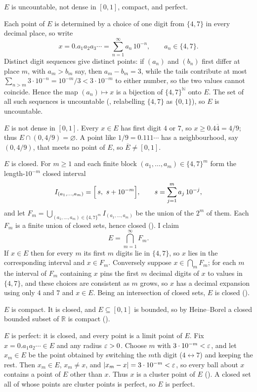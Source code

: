 \documentclass[main.tex]{subfiles}
\begin{document}
\begin{SolutionBlue}
$E$ is uncountable, not dense in $[0,1]$, compact, and perfect.

Each point of $E$ is determined by a choice of one digit from $\{4,7\}$ in every decimal place, so write
\[
x=0.a_1a_2a_3\cdots=\sum_{n=1}^{\infty}a_n\,10^{-n},\qquad a_n\in\{4,7\}.
\]
Distinct digit sequences give distinct points: if $(a_n)$ and $(b_n)$ first differ at place $m$, with
$a_m>b_m$ say, then $a_m-b_m=3$, while the tails contribute at most
$\sum_{n>m}3\cdot 10^{-n}=10^{-m}/3<3\cdot 10^{-m}$ to either number, so the two values cannot
coincide. Hence the map $(a_n)\mapsto x$ is a bijection of $\{4,7\}^{\mathbb N}$ onto $E$. The set of
all such sequences is uncountable (, relabelling $\{4,7\}$
as $\{0,1\}$), so $E$ is uncountable.

$E$ is not dense in $[0,1]$. Every $x\in E$ has first digit $4$ or $7$, so
$x\ge 0.4\overline{4}=4/9$; thus $E\cap(0,4/9)=\varnothing$. A point like $1/9=0.111\cdots$ has a
neighbourhood, say $(0,4/9)$, that meets no point of $E$, so $\overline E\ne[0,1]$.

$E$ is closed. For $m\ge 1$ and each finite block $(a_1,\dots,a_m)\in\{4,7\}^m$ form the length-$10^{-m}$
closed interval
\[
I_{(a_1,\dots,a_m)}=\Bigl[\,s,\ s+10^{-m}\Bigr],\qquad s=\sum_{j=1}^{m}a_j\,10^{-j},
\]
and let $F_m=\bigcup_{(a_1,\dots,a_m)\in\{4,7\}^m}I_{(a_1,\dots,a_m)}$ be the union of the
$2^m$ of them. Each $F_m$ is a finite union of closed sets, hence closed
(). I claim
\[
E=\bigcap_{m=1}^{\infty}F_m.
\]
If $x\in E$ then for every $m$ its first $m$ digits lie in $\{4,7\}$, so $x$ lies in the corresponding
interval and $x\in F_m$. Conversely suppose $x\in\bigcap_m F_m$; for each $m$ the interval of $F_m$
containing $x$ pins the first $m$ decimal digits of $x$ to values in $\{4,7\}$, and these choices are
consistent as $m$ grows, so $x$ has a decimal expansion using only $4$ and $7$ and $x\in E$. Being an
intersection of closed sets, $E$ is closed ().

$E$ is compact. It is closed, and $E\subseteq[0,1]$ is bounded, so by Heine--Borel a closed bounded
subset of $\mathbb R$ is compact ().

$E$ is perfect: it is closed, and every point is a limit point of $E$. Fix
$x=0.a_1a_2\cdots\in E$ and any radius $\varepsilon>0$. Choose $m$ with $3\cdot 10^{-m}<\varepsilon$, and let $x_m\in
E$ be the point obtained by switching the $m$th digit ($4\leftrightarrow7$) and keeping the rest. Then
$x_m\in E$, $x_m\ne x$, and $|x_m-x|=3\cdot 10^{-m}<\varepsilon$, so every ball about $x$ contains a point of
$E$ other than $x$. Thus $x$ is a cluster point of $E$ (). A closed set all of whose points
are cluster points is perfect, so $E$ is perfect.
\end{SolutionBlue}
\end{document}
